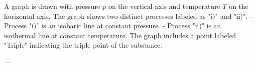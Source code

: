 A graph is drawn with pressure \( p \) on the vertical axis and temperature \( T \) on the horizontal axis. The graph shows two distinct processes labeled as "i)" and "ii)".  
- Process "i)" is an isobaric line at constant pressure.  
- Process "ii)" is an isothermal line at constant temperature.  
The graph includes a point labeled "Triple" indicating the triple point of the substance.  

---